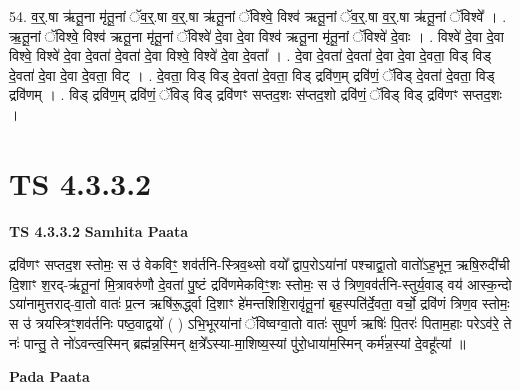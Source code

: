 \documentclass[17pt]{extarticle}
\begin{document}
54. व॒र्॒.षा ऋ॑तू॒ना मृ॑तू॒नां ॅव॒र्॒.षा व॒र्॒.षा ऋ॑तू॒नां ॅविश्वे॒ विश्व॑ ऋतू॒नां ॅव॒र्॒.षा व॒र्॒.षा ऋ॑तू॒नां ॅविश्वे᳚ । . ऋ॒तू॒नां ॅविश्वे॒ विश्व॑ ऋतू॒ना मृ॑तू॒नां ॅविश्वे॑ दे॒वा दे॒वा विश्व॑ ऋतू॒ना मृ॑तू॒नां ॅविश्वे॑ दे॒वाः । . विश्वे॑ दे॒वा दे॒वा विश्वे॒ विश्वे॑ दे॒वा दे॒वता॑ दे॒वता॑ दे॒वा विश्वे॒ विश्वे॑ दे॒वा दे॒वता᳚ । . दे॒वा दे॒वता॑ दे॒वता॑ दे॒वा दे॒वा दे॒वता॒ विड् विड् दे॒वता॑ दे॒वा दे॒वा दे॒वता॒ विट् । . दे॒वता॒ विड् विड् दे॒वता॑ दे॒वता॒ विड् द्रवि॑ण॒म् द्रवि॑णं॒ ॅविड् दे॒वता॑ दे॒वता॒ विड् द्रवि॑णम् । . विड् द्रवि॑ण॒म् द्रवि॑णं॒ ॅविड् विड् द्रवि॑णꣳ सप्तद॒शः स॑प्तद॒शो द्रवि॑णं॒ ॅविड् विड् द्रवि॑णꣳ सप्तद॒शः । \newline
\pagebreak
{}

\section{ TS 4.3.3.2 }

\textbf{TS 4.3.3.2 } \newline
\textbf{Samhita Paata} \newline

द्रवि॑णꣳ सप्तद॒श स्तोमः॒ स उ॑ वेकविꣳ॒॒ शव॑र्तनि-स्त्रिव॒थ्सो वयो᳚ द्वाप॒रोऽया॑नां पश्चाद्वा॒तो वातो॑ऽह॒भून॒ ऋषि॒रुदी॑ची दि॒शाꣳ श॒रद्-ऋ॑तू॒नां मि॒त्रावरु॑णौ दे॒वता॑ पु॒ष्टं द्रवि॑णमेकविꣳ॒॒शः स्तोमः॒ स उ॑ त्रिण॒वव॑र्तनि-स्तुर्य॒वाड् वय॑ आस्क॒न्दो ऽया॑नामुत्तराद्-वा॒तो वातः॑ प्र॒त्न ऋषि॑रू॒र्द्ध्वा दि॒शाꣳ हे॑मन्तशिशि॒रावृ॑तू॒नां बृह॒स्पति॑र्दे॒वता॒ वर्चो॒ द्रवि॑णं त्रिण॒व स्तोमः॒ स उ॑ त्रयस्त्रिꣳ॒॒शव॑र्तनिः पष्ठ॒वाद्वयो॑ ( ) ऽभि॒भूरया॑नां ॅविष्वग्वा॒तो वातः॑ सुप॒र्ण ऋषिः॑ पि॒तरः॑ पिताम॒हाः परेऽव॑रे॒ ते नः॑ पान्तु॒ ते नो॑ऽवन्त्व॒स्मिन् ब्रह्म॑न्न॒स्मिन् क्ष॒त्रे᳚ऽस्या-मा॒शिष्य॒स्यां पु॑रो॒धाया॑म॒स्मिन् कर्म॑न्न॒स्यां दे॒वहू᳚त्यां ॥ \newline

\textbf{Pada Paata} \newline
\end{document}
